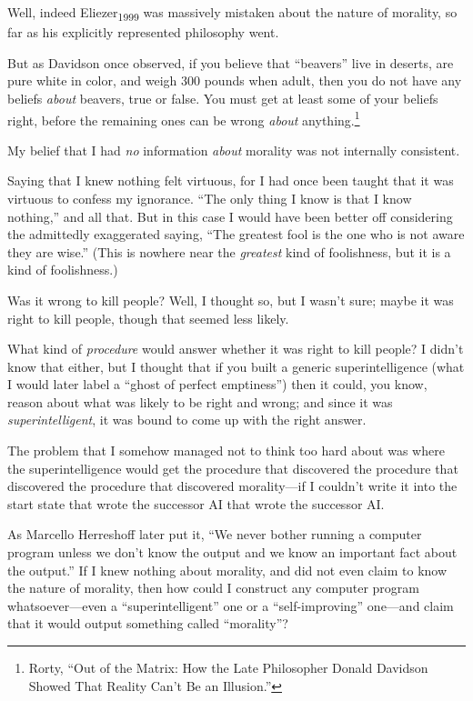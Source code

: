  Well, indeed Eliezer\textsubscript{1999} was massively mistaken
about the nature of morality, so far as his explicitly represented
philosophy went.

{
 But as Davidson once observed, if you believe that
``beavers'' live in deserts, are
pure white in color, and weigh 300 pounds when adult, then you do not
have any beliefs \textit{about} beavers, true or false. You must get at
least some of your beliefs right, before the remaining ones can be
wrong \textit{about} anything.\footnote{Rorty, ``Out of the Matrix: How the Late
Philosopher Donald Davidson Showed That Reality Can't
Be an Illusion.''}}


 My belief that I had \textit{no} information \textit{about}
morality was not internally consistent.


 Saying that I knew nothing felt virtuous, for I had once been
taught that it was virtuous to confess my ignorance.
``The only thing I know is that I know
nothing,'' and all that. But in this case I would
have been better off considering the admittedly exaggerated saying,
``The greatest fool is the one who is not aware they
are wise.'' (This is nowhere near the
\textit{greatest} kind of foolishness, but it is a kind of
foolishness.)


 Was it wrong to kill people? Well, I thought so, but I
wasn't sure; maybe it was right to kill people, though
that seemed less likely.


 What kind of \textit{procedure} would answer whether it was right
to kill people? I didn't know that either, but I
thought that if you built a generic superintelligence (what I would
later label a ``ghost of perfect
emptiness'') then it could, you know, reason about
what was likely to be right and wrong; and since it was
\textit{superintelligent}, it was bound to come up with the right
answer.


 The problem that I somehow managed not to think too hard about was
where the superintelligence would get the procedure that discovered the
procedure that discovered the procedure that discovered morality---if I
couldn't write it into the start state that wrote the
successor AI that wrote the successor AI.


 As Marcello Herreshoff later put it, ``We never
bother running a computer program unless we don't know
the output and we know an important fact about the
output.'' If I knew nothing about morality, and did
not even claim to know the nature of morality, then how could I
construct any computer program whatsoever---even a
``superintelligent'' one or a
``self-improving'' one---and claim
that it would output something called
``morality''?


